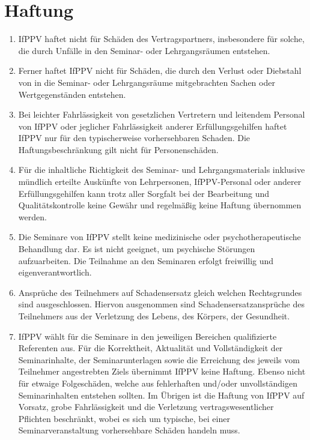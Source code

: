 \documentclass[a4paper, 12pt]{scrartcl}
\begin{document}
    \section{Haftung}
    \begin{enumerate}
	\item IfPPV haftet nicht für Sch\"aden des Vertragspartners, insbesondere f\"ur solche, die durch Unf\"alle in den Seminar- oder Lehrgangsräumen entstehen.
	\item Ferner haftet IfPPV nicht für Sch\"aden, die durch den Verlust oder Diebstahl von in die Seminar- oder Lehrgangsr\"aume mitgebrachten Sachen oder Wertgegenst\"anden entstehen.
	\item Bei leichter Fahrl\"assigkeit von gesetzlichen Vertretern und leitendem Personal von IfPPV oder jeglicher Fahrl\"assigkeit anderer Erf\"ullungsgehilfen haftet IfPPV nur f\"ur den typischerweise vorhersehbaren Schaden. Die Haftungsbeschr\"ankung gilt nicht für Personensch\"aden.
	\item F\"ur die inhaltliche Richtigkeit des Seminar- und Lehrgangsmaterials inklusive m\"undlich erteilte Ausk\"unfte von Lehrpersonen, IfPPV-Personal oder anderer Erf\"ullungsgehilfen kann trotz aller Sorgfalt bei der Bearbeitung und Qualit\"atskontrolle keine Gew\"ahr und regelm\"a{\ss}ig keine Haftung \"ubernommen werden.
	\item Die Seminare von IfPPV stellt keine medizinische oder psychotherapeutische Behandlung dar. Es ist nicht geeignet, um psychische St\"orungen aufzuarbeiten. Die Teilnahme an den Seminaren erfolgt freiwillig und eigenverantwortlich.
	\item Anspr\"uche des Teilnehmers auf Schadensersatz gleich welchen Rechtsgrundes sind ausgeschlossen. Hiervon ausgenommen sind Schadensersatzanspr\"uche des Teilnehmers aus der Verletzung des Lebens, des K\"orpers, der Gesundheit.
	\item IfPPV w\"ahlt für die Seminare in den jeweiligen Bereichen qualifizierte Referenten aus. F\"ur die Korrektheit, Aktualit\"at und Vollst\"andigkeit der Seminarinhalte, der Seminarunterlagen sowie die Erreichung des jeweils vom Teilnehmer angestrebten Ziels \"ubernimmt IfPPV keine Haftung. Ebenso nicht für etwaige Folgesch\"aden, welche aus fehlerhaften und/oder unvollst\"andigen Seminarinhalten entstehen sollten. Im \"Ubrigen ist die Haftung von IfPPV auf Vorsatz, grobe Fahrl\"assigkeit und die Verletzung vertragswesentlicher Pflichten beschr\"ankt, wobei es sich um typische, bei einer Seminarveranstaltung vorhersehbare Sch\"aden handeln muss.
    \end{enumerate}
\end{document}
